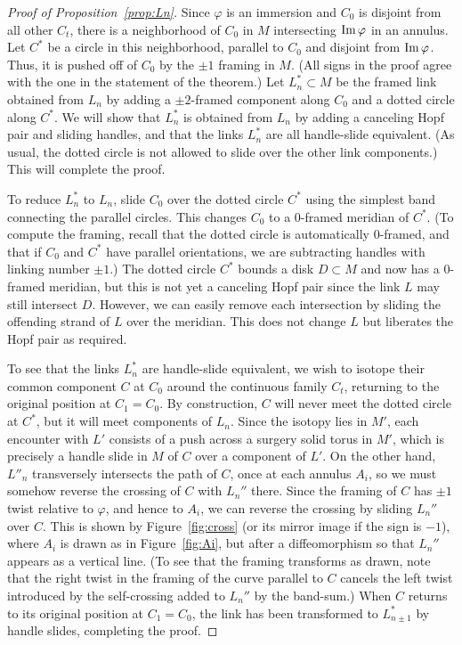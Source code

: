 \documentclass{amsart}
\def\im{\mathop{\rm Im}\nolimits}
\begin{document}
\begin{proof}[Proof of Proposition~\ref{prop:Ln}]
Since $\varphi$ is an immersion and $C_0$ is disjoint from all other $C_t$, there is a neighborhood of $C_0$ in $M$ intersecting $\im \varphi$ in an annulus. Let $C^*$ be a circle in this neighborhood, parallel to $C_0$ and disjoint from  $\im \varphi$. Thus, it is pushed off of $C_0$ by the $\pm 1$ framing in $M$. (All signs in the proof agree with the one in the statement of the theorem.) Let $L^*_n\subset M$ be the framed link obtained from $L_n$ by adding a $\pm 2$-framed component along $C_0$ and a dotted circle along $C^*$. We will show that $L_n^*$ is obtained from $L_n$ by adding a canceling Hopf pair and sliding handles, and that the links $L_n^*$ are all handle-slide equivalent. (As usual, the dotted circle is not allowed to slide over the other link components.) This will complete the proof.

To reduce $L^*_n$ to $L_n$, slide $C_0$ over the dotted circle $C^*$ using the simplest band connecting the parallel circles. This changes $C_0$ to a 0-framed meridian of $C^*$. (To compute the framing, recall that the dotted circle is automatically 0-framed, and that if $C_0$ and $C^*$ have parallel orientations, we are subtracting handles with linking number $\pm 1$.) The dotted circle $C^*$ bounds a disk $D\subset M$ and now has a 0-framed meridian, but this is not yet a canceling Hopf pair since the link $L$ may still intersect $D$. However, we can easily remove each intersection by sliding the offending strand of $L$ over the meridian. This does not change $L$ but liberates the Hopf pair as required.

To see that the links $L_n^*$ are handle-slide equivalent, we wish to isotope their common component $C$ at $C_0$ around the continuous family $C_t$, returning to the original position at $C_1=C_0$. By construction, $C$ will never meet the dotted circle at $C^*$, but it will meet components of $L_n$. Since the isotopy lies in $M'$, each encounter with $L'$ consists of a push across a surgery solid torus in $M'$, which is precisely a handle slide in $M$ of $C$ over a component of $L'$. On the other hand, $L''_n$ transversely intersects the path of $C$, once at each annulus $A_i$, so we must somehow reverse the crossing of $C$ with $L_n''$ there. Since the framing of $C$ has $\pm 1$ twist relative to $\varphi$, and hence to $A_i$, we can reverse the crossing by sliding $L_n''$ over $C$. This is shown by Figure~\ref{fig:cross} (or its mirror image if the sign is $-1$), where  $A_i$ is drawn as in Figure~\ref{fig:Ai}, but after a diffeomorphism so that $L_n''$ appears as a vertical line. (To see that the framing transforms as drawn, note that the right twist in the framing of the curve parallel to $C$ cancels the left twist introduced by the self-crossing added to $L_n''$ by the band-sum.) When $C$ returns to its original position at $C_1=C_0$, the link has been transformed to $L_{n\pm1}^*$ by handle slides, completing the proof.
\end{proof}
\end{document}
